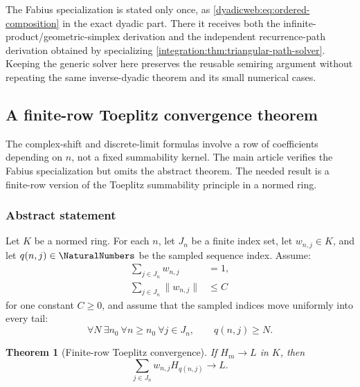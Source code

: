\documentclass[11pt,oneside]{article}
\newtheorem{theorem}{Theorem}[section]
\theoremstyle{definition}
\theoremstyle{remark}
\begin{document}
The Fabius specialization is stated only once, as
\eqref{dyadicweb:eq:ordered-composition} in the exact dyadic part.  There it receives both
the infinite-product/geometric-simplex derivation and the independent recurrence-path
derivation obtained by specializing \cref{integration:thm:triangular-path-solver}.  Keeping
the generic solver here preserves the reusable semiring argument without repeating the
same inverse-dyadic theorem and its small numerical cases.

\subsection{A finite-row Toeplitz convergence theorem}
\label{integration:sec:toeplitz}

The complex-shift and discrete-limit formulas involve a row of coefficients depending on
$n$, not a fixed summability kernel.  The main article verifies the Fabius specialization but
omits the abstract theorem.  The needed result is a finite-row version of the Toeplitz
summability principle in a normed ring.

\subsubsection{Abstract statement}

Let $K$ be a normed ring.  For each $n$, let $J_n$ be a finite index set, let
$w_{n,j}\in K$, and let $q(n,j)\in\NaturalNumbers$ be the sampled sequence index.  Assume:
\begin{align}
 \sum_{j\in J_n}w_{n,j}&=1,                                \label{integration:eq:toeplitz-row-mass}\\
 \sum_{j\in J_n}\|w_{n,j}\|&\le C                         \label{integration:eq:toeplitz-variation}
\end{align}
for one constant $C\ge0$, and assume that the sampled indices move uniformly into every
tail:
\begin{equation}
 \forall N\ \exists n_0\ \forall n\ge n_0\ \forall j\in J_n,
 \qquad q(n,j)\ge N.
 \label{integration:eq:toeplitz-tail-index}
\end{equation}

\begin{theorem}[Finite-row Toeplitz convergence]
\label{integration:thm:finite-row-toeplitz}
If $H_m\to L$ in $K$, then
\begin{equation}
 \sum_{j\in J_n}w_{n,j}H_{q(n,j)}\longrightarrow L.
 \label{integration:eq:finite-row-toeplitz}
\end{equation}
\end{theorem}
\end{document}
